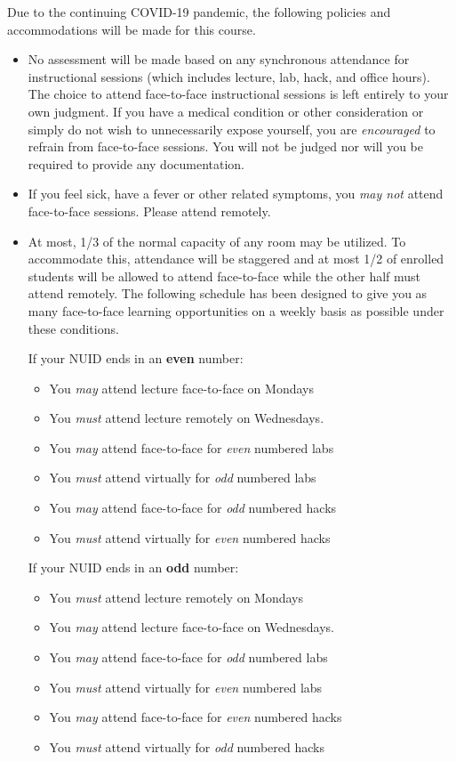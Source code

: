 \documentclass[12pt]{scrartcl}
\begin{document}
Due to the continuing COVID-19 pandemic, the following policies and
accommodations will be made for this course.
\begin{itemize}
  \item No assessment will be made based on any synchronous attendance 
  for instructional sessions (which includes lecture, lab, hack, and 
  office hours).  The choice to attend face-to-face
  instructional sessions is left entirely to your own judgment.  If you have
  a medical condition or other consideration or simply do not wish to
  unnecessarily expose yourself, you are \emph{encouraged} to refrain
  from face-to-face sessions.  You will not be judged nor will you be
  required to provide any documentation.
  
  \item If you feel sick, have a fever or other related symptoms, you
  \emph{may not} attend face-to-face sessions.  Please attend remotely.
  
  \item At most, 1/3 of the normal capacity of any room may be utilized.
  To accommodate this, attendance will be staggered and at most 1/2 of
  enrolled students will be allowed to attend face-to-face while the 
  other half must attend remotely.  The following schedule has been
  designed to give you as many face-to-face learning opportunities 
  on a weekly basis as possible under these conditions.
  
  If your NUID ends in an \textbf{even} number:
  \begin{itemize}
    \item You \emph{may} attend lecture face-to-face on Mondays 
    \item You \emph{must} attend lecture remotely on Wednesdays.
    \item You \emph{may} attend face-to-face for \emph{even} numbered labs
    \item You \emph{must} attend virtually for \emph{odd} numbered labs
    \item You \emph{may} attend face-to-face for \emph{odd} numbered hacks
    \item You \emph{must} attend virtually for \emph{even} numbered hacks
  \end{itemize}
  If your NUID ends in an \textbf{odd} number:
  \begin{itemize}
    \item You \emph{must} attend lecture remotely on Mondays 
    \item You \emph{may} attend lecture face-to-face on Wednesdays.
    \item You \emph{may} attend face-to-face for \emph{odd} numbered labs
    \item You \emph{must} attend virtually for \emph{even} numbered labs
    \item You \emph{may} attend face-to-face for \emph{even} numbered hacks
    \item You \emph{must} attend virtually for \emph{odd} numbered hacks
  \end{itemize}



\end{itemize}
\end{document}
